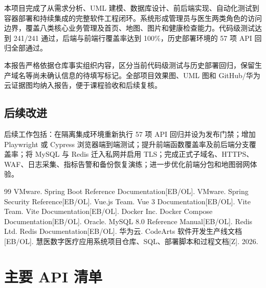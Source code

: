 \documentclass[UTF8,a4paper,12pt,openany,fontset=windows]{ctexrep}
\begin{document}
本项目完成了从需求分析、UML 建模、数据库设计、前后端实现、自动化测试到容器部署和持续集成的完整软件工程闭环。系统形成管理员与医生两类角色的访问边界，覆盖八类核心业务管理及首页、地图、图片和健康检查能力。代码级测试达到 241/241 通过，后端与前端行覆盖率达到 100\%，历史部署环境的 57 项 API 回归全部通过。

本报告严格依据仓库事实组织内容，区分当前代码级测试与历史部署回归，保留生产域名等尚未确认信息的待填写标记。全部项目效果图、UML 图和 GitHub/华为云证据图均纳入报告，便于课程验收和后续复核。

\section{后续改进}

后续工作包括：在隔离集成环境重新执行 57 项 API 回归并设为发布门禁；增加 Playwright 或 Cypress 浏览器端到端测试；提升前端函数覆盖率及前后端分支覆盖率；将 MySQL 与 Redis 迁入私网并启用 TLS；完成正式子域名、HTTPS、WAF、日志采集、指标告警和备份恢复演练；进一步优化前端分包和地图弱网体验。

\begin{thebibliography}{99}
   VMware. Spring Boot Reference Documentation[EB/OL].
   VMware. Spring Security Reference[EB/OL].
   Vue.js Team. Vue 3 Documentation[EB/OL].
   Vite Team. Vite Documentation[EB/OL].
   Docker Inc. Docker Compose Documentation[EB/OL].
   Oracle. MySQL 8.0 Reference Manual[EB/OL].
   Redis Ltd. Redis Documentation[EB/OL].
   华为云. CodeArts 软件开发生产线文档[EB/OL].
   慧医数字医疗应用系统项目仓库、SQL、部署脚本和过程文档[Z]. 2026.
\end{thebibliography}

\appendix
\chapter{主要 API 清单}
\end{document}
